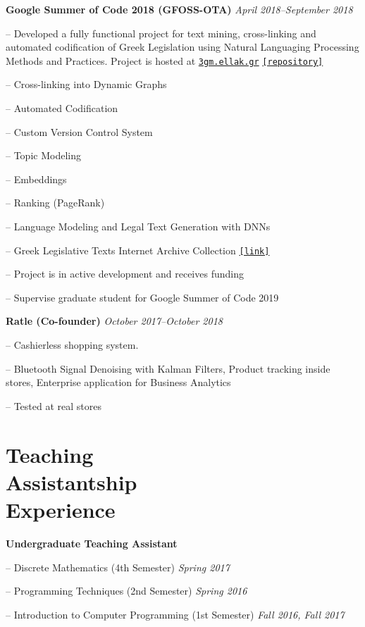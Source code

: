 \documentclass[margin, 10pt]{res}
\newcommand{\field}[2]{\noindent \textbf{#1} \hfill #2 \\}
\begin{document}
\begin{resume}
\field{Google Summer of Code 2018 (GFOSS-OTA)}  {\emph{April 2018--September 2018}}
\begin{compactitem}
\item[--] Developed a fully functional project for text mining, cross-linking and automated codification of Greek Legislation using Natural Languaging Processing Methods and Practices. Project is hosted at \href{https://3gm.ellak.gr}{\nolinkurl{3gm.ellak.gr}} \href{https://github.com/eellak/gsoc2018-3gm}{\nolinkurl{[repository]}}
\begin{compactitem}
\item[--] Cross-linking into Dynamic Graphs
\item[--] Automated Codification
\item[--] Custom Version Control System
\item[--] Topic Modeling 
\item[--] Embeddings
\item[--] Ranking (PageRank)
\item[--] Language Modeling and Legal Text Generation with DNNs
\item[--] Greek Legislative Texts Internet Archive Collection \href{https://archive.org/details/greekgovernmentgazette}{\nolinkurl{[link]}}
\end{compactitem} 
\item[--] Project is in active development and receives funding
\item[--] Supervise graduate student for Google Summer of Code 2019 
\end{compactitem}

\field{Ratle (Co-founder)} {\emph{October 2017--October 2018}}
\begin{compactitem}
\item[--] Cashierless shopping system.
\item[--] Bluetooth Signal Denoising with Kalman Filters, Product tracking inside stores, Enterprise application for Business Analytics
\item[--] Tested at real stores %
\end{compactitem}


\section{Teaching \\ Assistantship \\ Experience} 
\textbf{Undergraduate Teaching Assistant}
\begin{compactitem}
    \item[--] Discrete Mathematics (4th Semester) \hfill \emph{Spring 2017}
    \item[--] Programming Techniques (2nd Semester) \hfill \emph{Spring 2016}
    \item[--] Introduction to Computer Programming (1st Semester) \hfill \emph{Fall 2016, Fall 2017}
\end{compactitem}




\end{resume}
\end{document}
